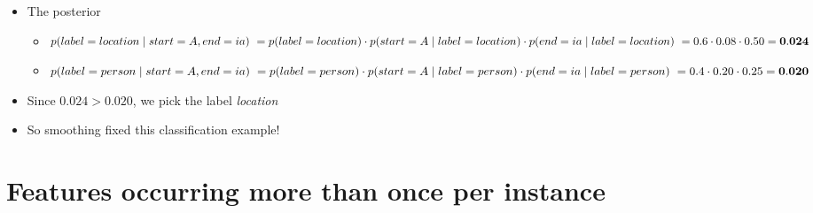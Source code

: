 \documentclass[11pt,letterpaper]{article}
\begin{document}
\begin{itemize}
\begin{itemize}
    \end{itemize}


  \item The posterior
    \begin{itemize}
      \item $p(label=location \mid start=A, end=ia) \\
            ~ = p(label=location) \cdot p(start=A \mid label=location) \cdot p(end=ia \mid label=location) \\
            ~ = 0.6 \cdot 0.08 \cdot 0.50 = \mathbf{0.024}$
      \item $p(label=person \mid start=A, end=ia) \\
            ~ = p(label=person) \cdot p(start=A \mid label=person) \cdot p(end=ia \mid label=person) \\
            ~ = 0.4 \cdot 0.20 \cdot 0.25 = \mathbf{0.020}$
    \end{itemize}
  \item Since $0.024 > 0.020$, we pick the label \textit{location}
  \item So smoothing fixed this classification example!
\end{itemize}



\section{Features occurring more than once per instance}
\end{document}
